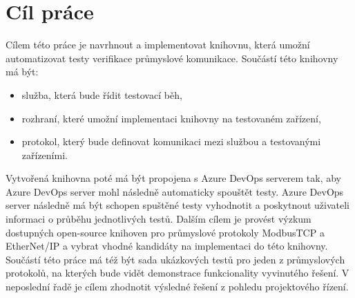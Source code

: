 \chapter{Cíl práce}\label{chap:cil}
Cílem této práce je navrhnout a implementovat knihovnu, která umožní automatizovat testy verifikace průmyslové komunikace. 
Součástí této knihovny má být:
\begin{itemize}
    \item služba, která bude řídit testovací běh,
    \item rozhraní, které umožní implementaci knihovny na testovaném zařízení,
    \item protokol, který bude definovat komunikaci mezi službou a testovanými zařízeními.
\end{itemize}
Vytvořená knihovna poté má být propojena s Azure DevOps serverem tak, aby Azure DevOps server mohl následně automaticky spouštět testy. Azure DevOps server následně má být schopen spuštěné testy vyhodnotit a poskytnout uživateli informaci o průběhu jednotlivých testů. 
Dalším cílem je provést výzkum dostupných open-source knihoven pro průmyslové protokoly ModbusTCP a EtherNet/IP a vybrat vhodné kandidáty na implementaci do této knihovny. 
Součástí této práce má též být sada ukázkových testů pro jeden z průmyslových protokolů, na kterých bude 
vidět demonstrace funkcionality vyvinutého řešení. V neposlední řadě je cílem zhodnotit výsledné řešení z 
pohledu projektového řízení.